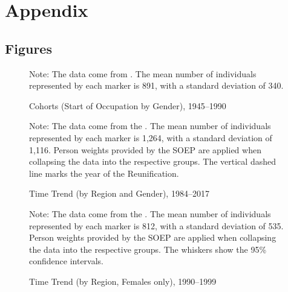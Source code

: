 \documentclass[a4paper, oneside, hyperfootnotes = false]{article}
\begin{document}
{\fontsize{11pt}{16.5pt}\selectfont

{}
\section*{Appendix}
\label{appendix}

{}
\subsection*{Figures}
\label{figures}

\begin{figure}[ht]
    \centering
    \caption{Cohorts (Start of Occupation by Gender), 1945--1990}
    \label{fig:mayer}
    \fontsize{9pt}{11pt}\selectfont
	\def\svgwidth{\textwidth}
	
    \vspace{2mm}
    \parbox{10cm}{
    \linespread{1}\footnotesize Note: The data come from \cite{Mayer1995}. The mean number of individuals represented by each marker is 891, with a standard deviation of 340.}
\end{figure}

\begin{figure}[ht]
	\centering
	\caption{Time Trend (by Region and Gender), 1984--2017}
	\label{fig:timetrend}
	\fontsize{9pt}{11pt}\selectfont
	\def\svgwidth{\textwidth}
	
	\vspace{2mm}
	\parbox{10cm}{
	\linespread{1}\footnotesize Note: The data come from the \cite{SOEP2023}. The mean number of individuals represented by each marker is 1,264, with a standard deviation of 1,116. Person weights provided by the SOEP are applied when collapsing the data into the respective groups. The vertical dashed line marks the year of the Reunification.}
\end{figure}

\begin{figure}[ht]
	\centering
	\caption{Time Trend (by Region, Females only), 1990--1999}
	\label{fig:timetrendzoom}
	\fontsize{9pt}{11pt}\selectfont
	\def\svgwidth{\textwidth}
	
	\vspace{2mm}
	\parbox{10cm}{
	\linespread{1}\footnotesize Note: The data come from the \cite{SOEP2023}. The mean number of individuals represented by each marker is 812, with a standard deviation of 535. Person weights provided by the SOEP are applied when collapsing the data into the respective groups. The whiskers show the 95\% confidence intervals.}
\end{figure}

}
\end{document}
